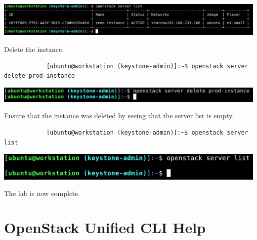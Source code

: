\documentclass[letterpaper, 12pt]{article}
\begin{document}
\begin{enumerate}
\begin{labstep}
        \begin{center}
            \includegraphics[width=\linewidth]{images/part2/step13.png}
        \end{center}
    \end{labstep}

    \begin{labstep}
        Delete the instance.
        \begin{lstlisting}
            [ubuntu@workstation (keystone-admin)]:~$ openstack server delete prod-instance
        \end{lstlisting}

        \begin{center}
            \includegraphics[width=\linewidth]{images/part2/step14.png}
        \end{center}
    \end{labstep}

    \begin{labstep}
        Ensure that the instance was deleted by seeing that the server list is empty.
        \begin{lstlisting}
            [ubuntu@workstation (keystone-admin)]:~$ openstack server list
        \end{lstlisting}

        \begin{center}
            \includegraphics[width=\linewidth]{images/part2/step15.png}
        \end{center}
    \end{labstep}

    \begin{labstep}
        The lab is now complete.
    \end{labstep}

\end{enumerate}

\appendix
\section{OpenStack Unified CLI Help}
\end{document}
